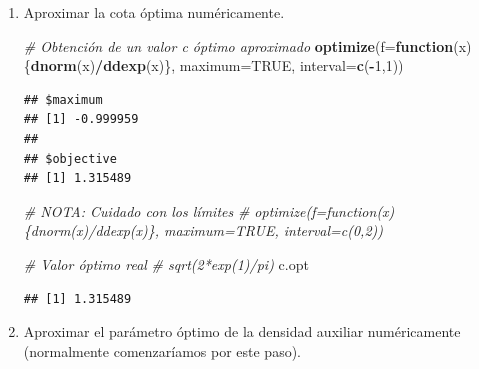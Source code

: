 \documentclass[]{book}
\newenvironment{Shaded}{\begin{snugshade}}{\end{snugshade}}
\newcommand{\KeywordTok}[1]{\textcolor[rgb]{0.13,0.29,0.53}{\textbf{#1}}}
\newcommand{\DataTypeTok}[1]{\textcolor[rgb]{0.13,0.29,0.53}{#1}}
\newcommand{\DecValTok}[1]{\textcolor[rgb]{0.00,0.00,0.81}{#1}}
\newcommand{\CommentTok}[1]{\textcolor[rgb]{0.56,0.35,0.01}{\textit{#1}}}
\newcommand{\OtherTok}[1]{\textcolor[rgb]{0.56,0.35,0.01}{#1}}
\newcommand{\ControlFlowTok}[1]{\textcolor[rgb]{0.13,0.29,0.53}{\textbf{#1}}}
\newcommand{\OperatorTok}[1]{\textcolor[rgb]{0.81,0.36,0.00}{\textbf{#1}}}
\newcommand{\NormalTok}[1]{#1}
\theoremstyle{definition}
\theoremstyle{definition}
\theoremstyle{definition}
\theoremstyle{remark}
\begin{document}
\begin{enumerate}
\def\labelenumi{\alph{enumi})}
\setcounter{enumi}{2}
\item
  Aproximar la cota óptima numéricamente.

\begin{Shaded}
\begin{Highlighting}[]
\CommentTok{# Obtención de un valor c óptimo aproximado}
\KeywordTok{optimize}\NormalTok{(}\DataTypeTok{f=}\ControlFlowTok{function}\NormalTok{(x)\{}\KeywordTok{dnorm}\NormalTok{(x)}\OperatorTok{/}\KeywordTok{ddexp}\NormalTok{(x)\}, }\DataTypeTok{maximum=}\OtherTok{TRUE}\NormalTok{, }\DataTypeTok{interval=}\KeywordTok{c}\NormalTok{(}\OperatorTok{-}\DecValTok{1}\NormalTok{,}\DecValTok{1}\NormalTok{))}
\end{Highlighting}
\end{Shaded}

\begin{verbatim}
## $maximum
## [1] -0.999959
## 
## $objective
## [1] 1.315489
\end{verbatim}

\begin{Shaded}
\begin{Highlighting}[]
\CommentTok{# NOTA: Cuidado con los límites}
\CommentTok{# optimize(f=function(x)\{dnorm(x)/ddexp(x)\}, maximum=TRUE, interval=c(0,2))}

\CommentTok{# Valor óptimo real}
\CommentTok{# sqrt(2*exp(1)/pi)}
\NormalTok{c.opt}
\end{Highlighting}
\end{Shaded}

\begin{verbatim}
## [1] 1.315489
\end{verbatim}
\item
  Aproximar el parámetro óptimo de la densidad auxiliar numéricamente
  (normalmente comenzaríamos por este paso).
\end{enumerate}
\end{document}
